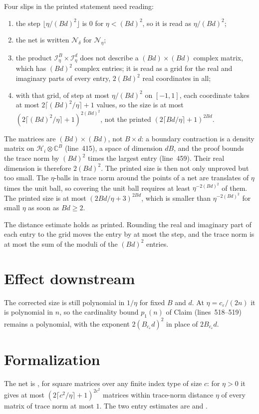 \documentclass{article}
\begin{document}
Four slips in the printed statement need reading:
\begin{enumerate}
    \item the step $\lfloor\eta/(Bd)^2\rfloor$ is $0$ for $\eta<(Bd)^2$, so
          it is read as $\eta/(Bd)^2$;
    \item the net is written $\mathcal N_\delta$ for $\mathcal N_\eta$;
    \item the product $\mathcal I_\eta^B\times\mathcal I_\eta^d$ does not
          describe a $(Bd)\times(Bd)$ complex matrix, which has $(Bd)^2$
          complex entries; it is read as a grid for the real and imaginary
          parts of every entry, $2(Bd)^2$ real coordinates in all;
    \item with that grid, of step at most $\eta/(Bd)^2$ on $[-1,1]$, each
          coordinate takes at most $2\lceil(Bd)^2/\eta\rceil+1$ values, so the
          size is at most $(2\lceil(Bd)^2/\eta\rceil+1)^{2(Bd)^2}$, not the
          printed $(2\lceil Bd/\eta\rceil+1)^{2Bd}$.
\end{enumerate}
The matrices are $(Bd)\times(Bd)$, not $B\times d$: a boundary contraction
is a density matrix on $\mathcal H_i\otimes\mathbb C^B$ (line~415), a space
of dimension $dB$, and the proof bounds the trace norm by $(Bd)^2$ times the
largest entry (line~459). Their real dimension is therefore $2(Bd)^2$. The
printed size is then not only unproved but too small. The $\eta$-balls in
trace norm around the points of a net are translates of $\eta$ times the unit
ball, so covering the unit ball requires at least $\eta^{-2(Bd)^2}$ of them.
The printed size is at most $(2Bd/\eta+3)^{2Bd}$, which is smaller than
$\eta^{-2(Bd)^2}$ for small $\eta$ as soon as $Bd\ge2$.

The distance estimate holds as printed. Rounding the real and imaginary part
of each entry to the grid moves the entry by at most the step, and the trace
norm is at most the sum of the moduli of the $(Bd)^2$ entries.

\section{Effect downstream}

The corrected size is still polynomial in $1/\eta$ for fixed $B$ and $d$.
At $\eta=c_\varepsilon/(2n)$ it is polynomial in $n$, so the cardinality
bound $p_1(n)$ of Claim  (lines~518--519) remains a polynomial, with the
exponent $2(B_{c_\varepsilon}d)^2$ in place of $2B_{c_\varepsilon}d$.

\section{Formalization}

The net is , for
square matrices over any finite index type of size $c$: for $\eta>0$ it
gives at most $(2\lceil c^2/\eta\rceil+1)^{2c^2}$ matrices within trace-norm
distance $\eta$ of every matrix of trace norm at most $1$. The two entry
estimates are  and
.



\end{document}
